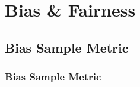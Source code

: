 \chapter{Bias \& Fairness}


\clearpage
\thispagestyle{biasfairnesstyle}
\section{Bias Sample Metric}
\subsection{Bias Sample Metric}
